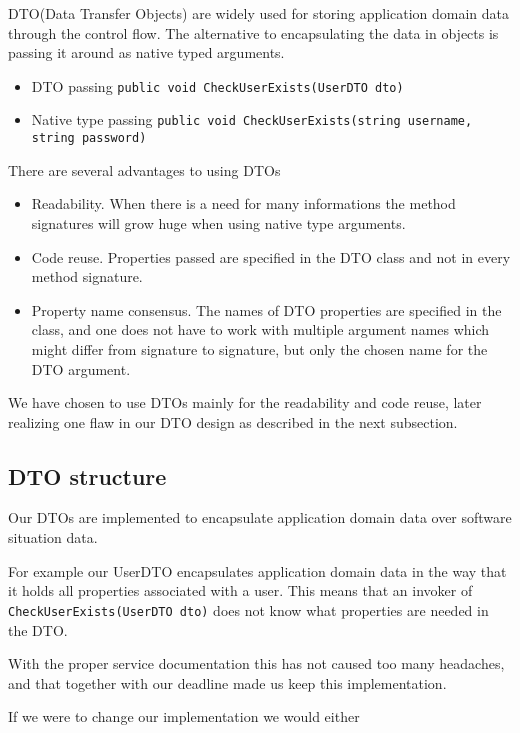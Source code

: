 \documentclass[../report.tex]{subfiles}
\begin{document}
DTO(Data Transfer Objects) are widely used for storing application domain data through the control flow. The alternative to encapsulating the data in objects is passing it around as native typed arguments.

\begin{itemize}
\item DTO passing
\subitem \texttt{public void CheckUserExists(UserDTO dto)}

\item Native type passing
\subitem \texttt{public void CheckUserExists(string username, string password)}
\end{itemize}

There are several advantages to using DTOs

\begin{itemize}
\item Readability. When there is a need for many informations the method signatures will grow huge when using native type arguments.
\item Code reuse. Properties passed are specified in the DTO class and not in every method signature.
\item Property name consensus. The names of DTO properties are specified in the class, and one does not have to work with multiple argument names which might differ from signature to signature, but only the chosen name for the DTO argument.
\end{itemize}

We have chosen to use DTOs mainly for the readability and code reuse, later realizing one flaw in our DTO design as described in the next subsection.


\subsection{DTO structure}

Our DTOs are implemented to encapsulate application domain data over software situation data.

For example our UserDTO encapsulates application domain data in the way that it holds all properties associated with a user. This means that an invoker of \texttt{CheckUserExists(UserDTO dto)} does not know what properties are needed in the DTO.

With the proper service documentation this has not caused too many headaches, and that together with our deadline made us keep this implementation.

If we were to change our implementation we would either
\end{document}
